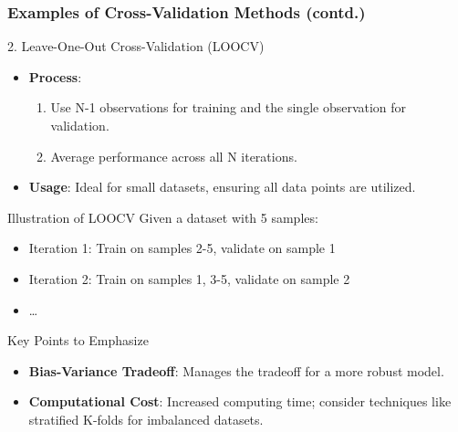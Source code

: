 \documentclass[aspectratio=169]{beamer}
\begin{document}
\begin{frame}[fragile]
    \frametitle{Examples of Cross-Validation Methods (contd.)}
    \begin{block}{2. Leave-One-Out Cross-Validation (LOOCV)}
        \begin{itemize}
            \item \textbf{Process}:
            \begin{enumerate}
                \item Use N-1 observations for training and the single observation for validation.
                \item Average performance across all N iterations.
            \end{enumerate}
            \item \textbf{Usage}: Ideal for small datasets, ensuring all data points are utilized.
        \end{itemize}
        
        \begin{block}{Illustration of LOOCV}
            Given a dataset with 5 samples:
            \begin{itemize}
                \item Iteration 1: Train on samples 2-5, validate on sample 1
                \item Iteration 2: Train on samples 1, 3-5, validate on sample 2
                \item \ldots
            \end{itemize}
        \end{block}
        
        \begin{block}{Key Points to Emphasize}
            \begin{itemize}
                \item \textbf{Bias-Variance Tradeoff}: Manages the tradeoff for a more robust model.
                \item \textbf{Computational Cost}: Increased computing time; consider techniques like stratified K-folds for imbalanced datasets.
            \end{itemize}
        \end{block}
    \end{block}
\end{frame}
\end{document}
